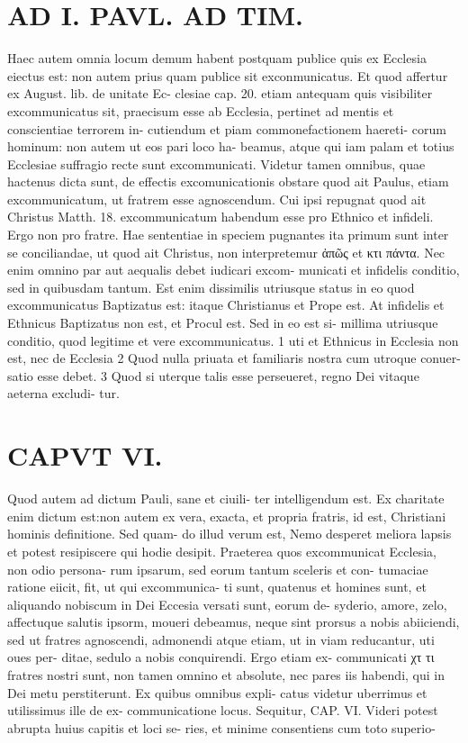 \documentclass{article}
\begin{document}
\begin{pages}
\section*{AD I. PAVL. AD TIM. }
\marginpar{[ p.Reo. ]}Haec autem omnia locum demum habent postquam publice quis ex Ecclesia eiectus est: non autem prius quam publice sit exconmunicatus. Et quod affertur ex August. lib. de unitate Ec- clesiae cap. 20. etiam antequam quis visibiliter excommunicatus sit, praecisum esse ab Ecclesia, pertinet ad mentis et conscientiae terrorem in- cutiendum et piam commonefactionem haereti- corum hominum: non autem ut eos pari loco ha- beamus, atque qui iam palam et totius Ecclesiae suffragio recte sunt excommunicati. Videtur tamen omnibus, quae hactenus dicta sunt, de effectis excomunicationis obstare quod ait Paulus, etiam excommunicatum, ut fratrem esse agnoscendum. Cui ipsi repugnat quod ait Christus Matth. 18. excommunicatum habendum esse pro Ethnico et infideli. Ergo non pro fratre. Hae sententiae in speciem pugnantes ita primum sunt inter se conciliandae, ut quod ait Christus, non interpretemur ἀπῶς et κτι πάντα. Nec enim omnino par aut aequalis debet iudicari excom- municati et infidelis conditio, sed in quibusdam tantum. Est enim dissimilis utriusque status in eo quod excommunicatus Baptizatus est: itaque Christianus et Prope est. At infidelis et Ethnicus Baptizatus non est, et Procul est. Sed in eo est si- millima utriusque conditio, quod legitime et vere excommunicatus. 1 uti et Ethnicus in Ecclesia non est, nec de Ecclesia 2 Quod nulla priuata et familiaris nostra cum utroque conuer- satio esse debet. 3 Quod si uterque talis esse perseueret, regno Dei vitaque aeterna excludi- tur. 
\section*{CAPVT  VI. }
\marginpar{[ p.409 ]}Quod autem ad dictum Pauli, sane et ciuili- ter intelligendum est. Ex charitate enim dictum est:non autem ex vera, exacta, et propria fratris, id est, Christiani hominis definitione. Sed quam- do illud verum est, Nemo desperet meliora lapsis et potest resipiscere qui hodie desipit. Praeterea quos excommunicat Ecclesia, non odio persona- rum ipsarum, sed eorum tantum sceleris et con- tumaciae ratione eiicit, fit, ut qui excommunica- ti sunt, quatenus et homines sunt, et aliquando nobiscum in Dei Eccesia versati sunt, eorum de- syderio, amore, zelo, affectuque salutis ipsorm, moueri debeamus, neque sint prorsus a nobis abiiciendi, sed ut fratres agnoscendi, admonendi atque etiam, ut in viam reducantur, uti oues per- ditae, sedulo a nobis conquirendi. Ergo etiam ex- communicati χτ τι fratres nostri sunt, non tamen omnino et absolute, nec pares iis habendi, qui in Dei metu perstiterunt. Ex quibus omnibus expli- catus videtur uberrimus et utilissimus ille de ex- communicatione locus. Sequitur, CAP. VI.     Videri potest abrupta huius capitis et loci se- ries, et minime consentiens cum toto superio- 
\end{pages}
\end{document}
